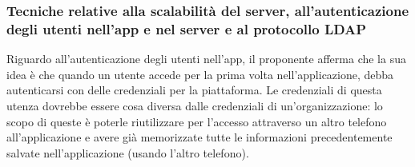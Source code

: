 \subsubsection*{Tecniche relative alla scalabilità del server, all'autenticazione degli utenti nell'app e nel server e al protocollo LDAP}
Riguardo all'autenticazione degli utenti nell'app, il proponente afferma che la sua idea è che quando un utente accede per la prima volta nell'applicazione, debba autenticarsi con delle credenziali per la piattaforma.
Le credenziali di questa utenza dovrebbe essere cosa diversa dalle credenziali di un'organizzazione: lo scopo di queste è poterle riutilizzare per l'accesso attraverso un altro telefono all'applicazione e avere già
memorizzate tutte le informazioni precedentemente salvate nell'applicazione (usando l'altro telefono).\\
\clearpage